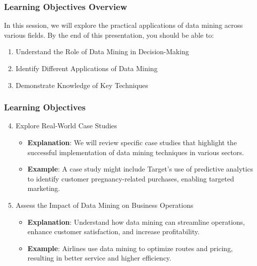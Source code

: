 \documentclass{beamer}
\begin{document}
\begin{frame}[fragile]
    \frametitle{Learning Objectives Overview}
    In this session, we will explore the practical applications of data mining across various fields. By the end of this presentation, you should be able to:
    
    \begin{enumerate}
        \item Understand the Role of Data Mining in Decision-Making
        \item Identify Different Applications of Data Mining
        \item Demonstrate Knowledge of Key Techniques
    \end{enumerate}
\end{frame}

\begin{frame}[fragile]
    \frametitle{Learning Objectives}
    
    \begin{enumerate}
        \setcounter{enumi}{3} %
        \item Explore Real-World Case Studies
        \begin{itemize}
            \item \textbf{Explanation}: We will review specific case studies that highlight the successful implementation of data mining techniques in various sectors.
            \item \textbf{Example}: A case study might include Target's use of predictive analytics to identify customer pregnancy-related purchases, enabling targeted marketing.
        \end{itemize}
        
        \item Assess the Impact of Data Mining on Business Operations
        \begin{itemize}
            \item \textbf{Explanation}: Understand how data mining can streamline operations, enhance customer satisfaction, and increase profitability.
            \item \textbf{Example}: Airlines use data mining to optimize routes and pricing, resulting in better service and higher efficiency.
        \end{itemize}
    \end{enumerate}
\end{frame}
\end{document}
